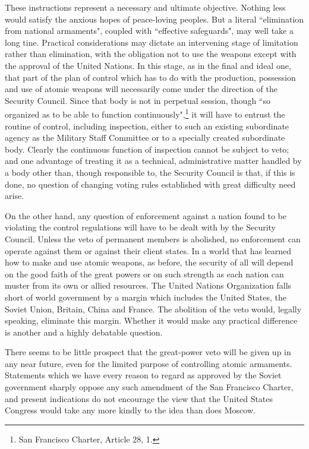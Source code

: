 These instructions represent a necessary and ultimate objective. Nothing less would satisfy the anxious hopes of peace-loving peoples. But a literal ``elimination from national armaments", coupled with ``effective safeguards", may well take a long tine. Practical considerations may dictate an intervening stage of limitation rather than elimination, with the obligation not to use the weapons except with the approval of the United Nations. In this stage, as in the final and ideal one, that part of the plan of control which has to do with the production, possession and use of atomic weapons will necessarily come under the direction of the Security Council. Since that body is not in perpetual session, though ``so organized as to be able to function continuously",\footnote{San Francisco Charter, Article 28, 1.} it will have to entrust the routine of control, including inspection, either to such an existing subordinate agency as the Military Staff Committee or to a specially created subordinate body. Clearly the continuous function of inspection cannot be subject to veto; and one advantage of treating it as a technical, administrative matter handled by a body other than, though responsible to, the Security Council is that, if this is done, no question of changing voting rules established with great difficulty need arise.

On the other hand, any question of enforcement against a nation found to be violating the control regulations will have to be dealt with by the Security Council. Unless the veto of permanent members is abolished, no enforcement can operate against them or against their client states. In a world that has learned how to make and use atomic weapons, as before, the security of all will depend on the good faith of the great powers or on such strength as each nation can muster from its own or allied resources. The United Nations Organization falls short of world government by a margin which includes the United States, the Soviet Union, Britain, China and France. The abolition of the veto would, legally speaking, eliminate this margin. Whether it would make any practical difference is another and a highly debatable question.

There seems to be little prospect that the great-power veto will be given up in any near future, even for the limited purpose of controlling atomic armaments. Statements which we have every reason to regard as approved by the Soviet government sharply oppose any such amendment of the San Francisco Charter, and present indications do not encourage the view that the United States Congress would take any more kindly to the idea than does Moscow.

